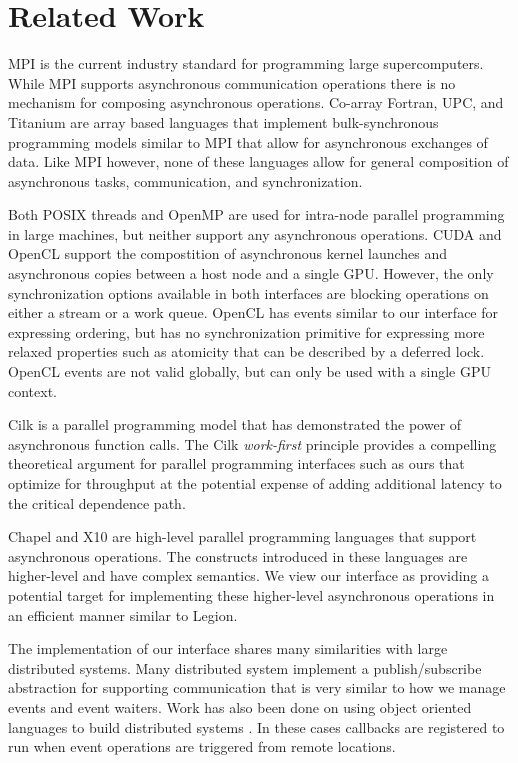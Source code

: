 
\section{Related Work}
\label{sec:related}

MPI is the current industry standard for programming large
supercomputers\cite{MPI}.  While MPI supports asynchronous
communication operations there is no mechanism for composing
asynchronous operations.  Co-array Fortran, UPC, and Titanium
are array based languages that implement bulk-synchronous
programming models similar to MPI that allow for asynchronous
exchanges of data\cite{COARRAY_FORTRAN,UPC99,JV:Yel98}.  Like
MPI however, none of these languages allow for general composition
of asynchronous tasks, communication, and synchronization.

Both POSIX threads and OpenMP\cite{OPENMP98} are used for intra-node parallel
programming in large machines, but neither support any asynchronous
operations.  CUDA\cite{CUDA} and OpenCL\cite{Khronos:OpenCL} support
the compostition of asynchronous kernel launches and asynchronous copies
between a host node and a single GPU.  However, the only synchronization
options available in both interfaces are blocking operations on either
a stream or a work queue.  OpenCL has events similar to our interface for
expressing ordering, but has no synchronization primitive for expressing
more relaxed properties such as atomicity that can be described by a
deferred lock.  OpenCL events are not valid globally, but can only be
used with a single GPU context.

Cilk is a parallel programming model that has demonstrated the power of
asynchronous function calls\cite{CILK95}.  The Cilk {\em work-first}
principle provides a compelling theoretical argument for parallel programming
interfaces such as ours that optimize for throughput at the potential
expense of adding additional latency to the critical 
dependence path\cite{Frigo98}.

Chapel\cite{Chamberlain:Chapel} and X10\cite{X1005} are high-level parallel
programming languages that support asynchronous operations.  The constructs
introduced in these languages are higher-level and have complex 
semantics.  We view our interface as providing a potential target
for implementing these higher-level asynchronous operations in an efficient
manner similar to Legion\cite{Legion12}.

The implementation of our interface shares many similarities with large
distributed systems.  Many distributed system implement a publish/subscribe
abstraction for supporting communication that is very similar to how
we manage events and event waiters\cite{Aguilera99,Carzaniga01}.  Work has
also been done on using object oriented languages to build 
distributed systems \cite{Eugster01,Harrison97,Chang91}.  In these cases
callbacks are registered to run when event operations are triggered
from remote locations.

